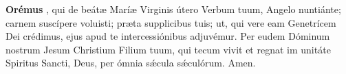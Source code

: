 \textbf{Orémus}
, qui de beát{\ae} Marí{\ae} Virginis útero Verbum tuum, Angelo nuntiánte; carnem suscípere voluisti; pr{\ae}ta supplicibus tuis; ut, qui vere eam Genetrícem
Dei crédimus, ejus apud te intercessiónibus adjuvémur. Per eudem Dóminum nostrum Jesum Christium Filium tuum, qui tecum vivit et regnat im unitáte Spiritus Sancti, Deus, per ómnia
s{\'\ae}cula s{\'\ae}culórum. Amen.